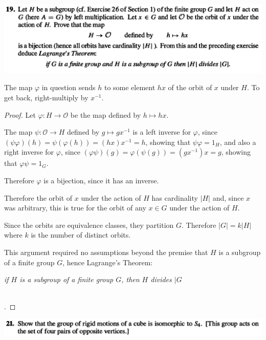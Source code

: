 \begin{mdframed}
\includegraphics[width=400pt]{img/abstract-algebra--nf--4-4140.png}
\end{mdframed}

\begin{intuition}
  The map $\varphi$ in question sends $h$ to some element $hx$ of the orbit of $x$ under $H$.
  To get back, right-multiply by $x^{-1}$.

\end{intuition}

\begin{proof}
  Let $\varphi: H \to \mathcal O$ be the map defined by $h \mapsto hx$.

  The map $\psi: \mathcal O \to H$ defined by $g \mapsto gx^{-1}$ is a left inverse for $\varphi$,
  since $(\psi\varphi)(h) = \psi(\varphi(h)) = (hx)x^{-1} = h$, showing that $\psi\varphi = 1_H$, and also a right inverse
  for $\varphi$, since $(\varphi\psi)(g) = \varphi(\psi(g)) = (gx^{-1})x = g$, showing that $\varphi\psi = 1_G$.

  Therefore $\varphi$ is a bijection, since it has an inverse.

  Therefore the orbit of $x$ under the action of $H$ has cardinality $|H|$ and, since $x$ was
  arbitrary, this is true for the orbit of any $x \in G$ under the action of $H$.

  Since the orbits are equivalence classes, they partition $G$. Therefore $|G| = k|H|$ where $k$ is
  the number of distinct orbits.

  This argument required no assumptions beyond the premise that $H$ is a subgroup of a finite
  group $G$, hence Lagrange's Theorem:

  {\it if $H$ is a subgroup of a finite group $G$, then $H$ divides $|G$}


  ~\\
.
\end{proof}

\begin{mdframed}
\includegraphics[width=400pt]{img/abstract-algebra--nf--4-0e63.png}
\end{mdframed}

